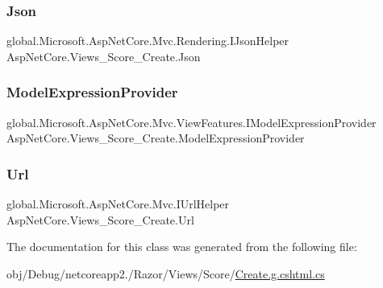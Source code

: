 \subsubsection{\texorpdfstring{Json}{Json}}
{\footnotesize\ttfamily global.\+Microsoft.\+Asp\+Net\+Core.\+Mvc.\+Rendering.\+I\+Json\+Helper Asp\+Net\+Core.\+Views\+\_\+\+Score\+\_\+\+Create.\+Json\hspace{0.3cm}{\ttfamily [get]}}

\mbox{\label{class_asp_net_core_1_1_views___score___create_a36269b113467c330da7fb625b15a187e}} 
\subsubsection{\texorpdfstring{ModelExpressionProvider}{ModelExpressionProvider}}
{\footnotesize\ttfamily global.\+Microsoft.\+Asp\+Net\+Core.\+Mvc.\+View\+Features.\+I\+Model\+Expression\+Provider Asp\+Net\+Core.\+Views\+\_\+\+Score\+\_\+\+Create.\+Model\+Expression\+Provider\hspace{0.3cm}{\ttfamily [get]}}

\mbox{\label{class_asp_net_core_1_1_views___score___create_a20df7fc400bde500b6c29279fce31dec}} 
\subsubsection{\texorpdfstring{Url}{Url}}
{\footnotesize\ttfamily global.\+Microsoft.\+Asp\+Net\+Core.\+Mvc.\+I\+Url\+Helper Asp\+Net\+Core.\+Views\+\_\+\+Score\+\_\+\+Create.\+Url\hspace{0.3cm}{\ttfamily [get]}}



The documentation for this class was generated from the following file\+:\begin{DoxyCompactItemize}
\item 
obj/\+Debug/netcoreapp2./\+Razor/\+Views/\+Score/\mbox{\hyperlink{_create_8g_8cshtml_8cs}{Create.\+g.\+cshtml.\+cs}}\end{DoxyCompactItemize}
